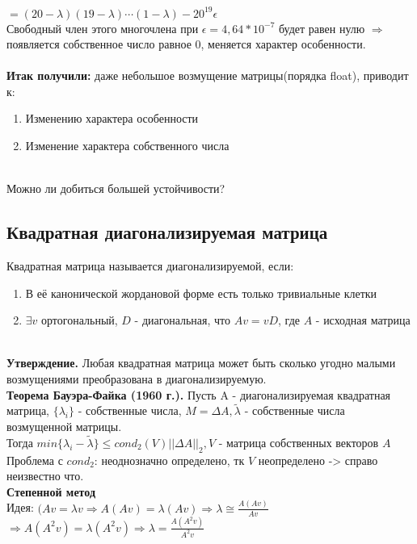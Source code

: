     \(= (20- \lambda)(19-\lambda)\cdots(1-\lambda)-20^{19}\epsilon\) \\
Свободный член этого многочлена при \(\epsilon = 4,64*10^{-7}\) будет равен нулю \(\Rightarrow\) появляется собственное число равное 0, меняется характер особенности.
\\ \\
\textbf{Итак получили:} даже небольшое возмущение матрицы(порядка float), приводит к:
    \begin{enumerate}
        \item Изменению характера особенности
        \item Изменение характера собственного числа
    \end{enumerate}
\\

    Можно ли добиться большей устойчивости?

    \subsection{Квадратная диагонализируемая матрица}
    Квадратная матрица называется диагонализируемой, если:
    \begin{enumerate}
        \item В её канонической жордановой форме есть только тривиальные клетки
        \item \(\exists v\) ортогональный, \(D\) - диагональная, что \(Av = vD\), где \(A\) - исходная матрица
    \end{enumerate} \\

    \textbf{Утверждение.} Любая квадратная матрица может быть сколько угодно малыми возмущениями преобразована в диагонализируемую. \\
    
    \textbf{Теорема Бауэра-Файка (1960 г.).} Пусть A - диагонализируемая квадратная матрица, \(\{\lambda_i\}\) - собственные числа, \(M = \Delta A,\tilde{\lambda}\) - собственные числа возмущенной матрицы. \\
    Тогда \(min\{\lambda_i - \tilde{\lambda}\} \leq cond_2(V) ||\Delta A||_2 , V\) - матрица собственных векторов \(A\) \\
    Проблема с $cond_2$: неоднозначно определено, тк $V$ неопределено -> справо неизвестно что. \\
    
    \textbf{Степенной метод} \\
    Идея: $(Av = \lambda v \Rightarrow A(Av) = \lambda(Av) \Rightarrow \lambda \cong \frac{A(Av)}{Av} $ \\ $\Rightarrow $$A(A^2v) = \lambda(A^2v) \Rightarrow \lambda = \frac{A(A^2v)}{A^2v}$ \\
    
